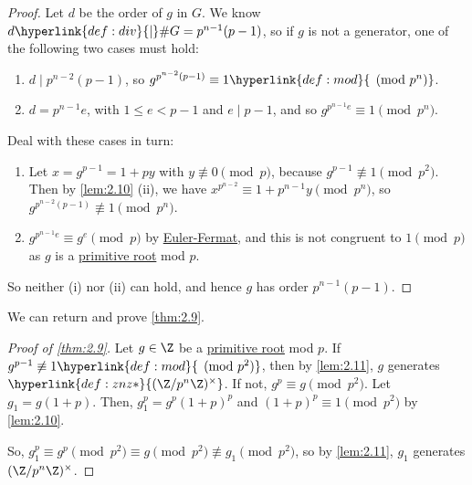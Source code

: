 \documentclass{article}
\begin{document}
\begin{proof}
    Let $d$ be the order of $g$ in $G$.
    We know $d \hyperlink{def:div}{\mid} \#G = p^{n-1}(p-1)$, so if $g$ is not a generator, one of the following two cases must hold:

    \begin{enumerate}[label=(\roman*)]
        \item $d \mid p^{n-2} (p-1)$, so $g^{p^{n-2}(p-1)} \equiv 1 \hyperlink{def:mod}{\pmod{p^n}}$.
        \item $d = p^{n-1} e$, with $1 \leq e < p-1$ and $e \mid p-1$, and so $g^{p^{n-1} e} \equiv 1 \pmod{p^n}$.
    \end{enumerate}
    Deal with these cases in turn:

    \begin{enumerate}[label=(\roman*)]
        \item Let $x = g^{p-1} = 1+py$ with $y \not\equiv 0 \pmod{p}$, because $g^{p-1} \not\equiv 1 \pmod{p^2}$.
            Then by \cref{lem:2.10} (ii), we have $x^{p^{n-2}} \equiv 1 + p^{n-1} y \pmod{p^n}$, so $g^{p^{n-2}(p-1)} \not\equiv 1 \pmod{p^n}$.

        \item $g^{p^{n-1}e} \equiv g^e \pmod{p}$ by \hyperlink{thm:eulerFermat}{Euler-Fermat}, and this is not congruent to $1 \pmod{p}$ as $g$ is a \hyperlink{def:primRoot}{primitive root} mod $p$.
    \end{enumerate}

    So neither (i) nor (ii) can hold, and hence $g$ has order $p^{n-1}(p-1)$.
\end{proof}

We can return and prove \cref{thm:2.9}.

\begin{proof}[Proof of \cref{thm:2.9}]\label{pf:2.9}
    Let $g \in \Z$ be a \hyperlink{def:primRoot}{primitive root} mod $p$.
    If $g^{p-1} \not\equiv 1 \hyperlink{def:mod}{\pmod{p^2}}$, then by \cref{lem:2.11}, $g$ generates $\hyperlink{def:znz*}{(\Z/p^n \Z)^\times}$.
    If not, $g^p \equiv g \pmod{p^2}$. Let $g_1 = g(1 + p)$.
    Then, $g_1^p = g^p (1+p)^p$ and $(1+p)^p \equiv 1 \pmod{p^2}$ by \cref{lem:2.10}.

    So, $g_1^p \equiv g^p \pmod{p^2} \equiv g \pmod{p^2} \not\equiv g_1 \pmod{p^2}$, so by \cref{lem:2.11}, $g_1$ generates $(\Z/p^n \Z)^\times$.
\end{proof}
\end{document}
